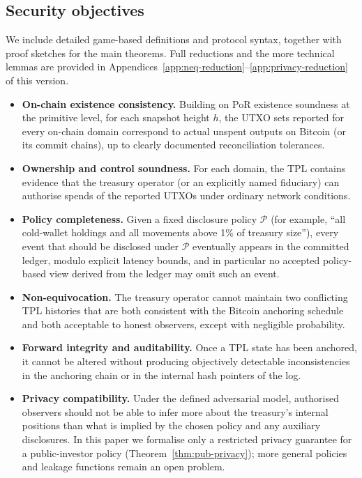 \documentclass[11pt]{article}
\begin{document}
\subsection{Security objectives}

We include detailed game-based definitions and protocol syntax, together with proof sketches for the main theorems.
Full reductions and the more technical lemmas are provided in Appendices~\ref{app:neq-reduction}--\ref{app:privacy-reduction} of this version.

\begin{itemize}[noitemsep]
\item \textbf{On-chain existence consistency.} Building on PoR existence soundness at the primitive level, for each snapshot height $h$, the UTXO sets reported for every on-chain domain correspond to actual unspent outputs on Bitcoin (or its commit chains), up to clearly documented reconciliation tolerances.
\item \textbf{Ownership and control soundness.} For each domain, the TPL contains evidence that the treasury operator (or an explicitly named fiduciary) can authorise spends of the reported UTXOs under ordinary network conditions.
\item \textbf{Policy completeness.} Given a fixed disclosure policy $\mathcal{P}$ (for example, ``all cold-wallet holdings and all movements above 1\% of treasury size''), every event that should be disclosed under $\mathcal{P}$ eventually appears in the committed ledger, modulo explicit latency bounds, and in particular no accepted policy-based view derived from the ledger may omit such an event.
\item \textbf{Non-equivocation.} The treasury operator cannot maintain two conflicting TPL histories that are both consistent with the Bitcoin anchoring schedule and both acceptable to honest observers, except with negligible probability.
\item \textbf{Forward integrity and auditability.} Once a TPL state has been anchored, it cannot be altered without producing objectively detectable inconsistencies in the anchoring chain or in the internal hash pointers of the log.
\item \textbf{Privacy compatibility.} Under the defined adversarial model, authorised observers should not be able to infer more about the treasury's internal positions than what is implied by the chosen policy and any auxiliary disclosures. In this paper we formalise only a restricted privacy guarantee for a public-investor policy (Theorem~\ref{thm:pub-privacy}); more general policies and leakage functions remain an open problem.
\end{itemize}
\end{document}
